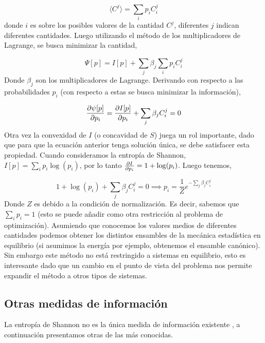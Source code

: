 \documentclass[executivepaper,12pt]{article}
\numberwithin{equation}{section}
\begin{document}
\begin{equation*}
	\langle C^j \rangle=\sum_i p_i C_i^j
\end{equation*}
donde $i$ es sobre los posibles valores de la cantidad $C^j$, diferentes $j$ indican diferentes cantidades. Luego utilizando el método de los multiplicadores de Lagrange, se busca minimizar la cantidad,

\begin{equation*}
	\Psi [p]= I[p]+\sum_j \beta_j \sum_i p_i C_i ^j
\end{equation*}
Donde $\beta_j$ son los multiplicadores de Lagrange. Derivando con respecto a las probabilidades $p_i$ (con respecto a estas se busca minimizar la información), 

\begin{equation*}
	\pdv{\psi[p]}{p_i}=\pdv{I[p]}{p_i}+\sum_j\beta_jC_i^j=0
\end{equation*}
Otra vez la convexidad de $I$ (o concavidad de $S$) juega un rol importante, dado que para que la ecuación anterior tenga solución única, se debe satisfacer esta propiedad. Cuando consideramos la entropía de Shannon, $I[p]=\sum_i p_i\log(p_i)$, por lo tanto $\pdv{I}{p_i}=1+\log(p_i)$. Luego tenemos,

\begin{equation*}
	1+\log(p_i)+\sum_j\beta_jC_i^j=0\implies p_i=\frac{1}{Z}e^{-\sum_j\beta_j C^j_i }
\end{equation*}
Donde $Z$ es debido a la condición de normalización. Es decir, sabemos que $\sum_i p_i =1$ (esto se puede añadir como otra restricción al problema de optimización). Asumiendo que conocemos los valores medios de diferentes cantidades podemos obtener los distintos ensambles de la mecánica estadística en equilibrio (si asumimos la energía por ejemplo, obtenemos el ensamble canónico). Sin embargo este método no está restringido a sistemas en equilibrio, esto es interesante dado que un cambio en el punto de vista del problema nos permite expandir el método a otros tipos de sistemas.  


\subsection{Otras medidas de información}


La entropía de Shannon no es la única medida de información existente \parencite{beck2009}, a continuación presentamos otras de las más conocidas.\\
\end{document}
